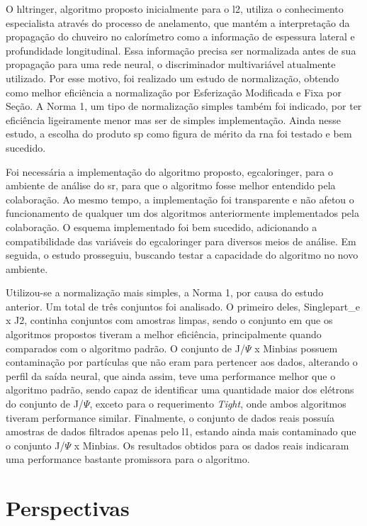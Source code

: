 O \gls{hltringer}, algoritmo proposto inicialmente para o \gls{l2}, utiliza o
conhecimento especialista através do processo de anelamento, que mantém a interpretação da propagação do
chuveiro no calorímetro como a informação de espessura lateral e profundidade
longitudinal. Essa informação precisa ser normalizada antes de sua propagação
para uma rede neural, o discriminador multivariável atualmente utilizado.
Por esse motivo, foi realizado um estudo de normalização, obtendo como 
melhor eficiência a normalização por Esferização Modificada e Fixa por Seção.
A Norma 1, um tipo de normalização simples também foi indicado, por ter
eficiência ligeiramente menor mas ser de simples implementação. Ainda nesse
estudo, a escolha do produto \gls{sp} como figura de mérito da \gls{rna} foi
testado e bem sucedido.

Foi necessária a implementação do algoritmo proposto, \gls{egcaloringer}, para o ambiente de análise
do \gls{sr}, para que o algoritmo fosse melhor
entendido pela colaboração. Ao mesmo tempo, a implementação foi transparente e não
afetou o funcionamento de qualquer um dos algoritmos anteriormente implementados
pela colaboração. O esquema implementado foi bem sucedido, adicionando a compatibilidade das variáveis
do \gls{egcaloringer} para diversos meios de análise. Em seguida, o estudo
prosseguiu, buscando testar a capacidade do algoritmo no novo ambiente.

Utilizou-se a normalização mais simples, a Norma 1, por causa do estudo anterior.
Um total de três conjuntos foi analisado. O primeiro deles, Singlepart\_e x J2,
continha conjuntos com amostras limpas, sendo o conjunto em que os algoritmos
propostos tiveram a melhor eficiência, principalmente quando comparados com o
algoritmo padrão. O conjunto de J/$\Psi$ x Minbias possuem contaminação por
partículas que não eram para pertencer aos dados, alterando o perfil da saída
neural, que ainda assim, teve uma performance melhor que o algoritmo padrão, sendo
capaz de identificar uma quantidade maior dos elétrons do conjunto de J/$\Psi$,
exceto para o requerimento \emph{Tight}, onde ambos algoritmos tiveram
performance similar. Finalmente, o conjunto de dados reais possuía amostras de
dados filtrados apenas pelo \gls{l1}, estando ainda mais contaminado que o
conjunto J/$\Psi$ x Minbias. Os resultados obtidos para os dados reais indicaram
uma performance bastante promissora para o algoritmo. 

  
\section{Perspectivas}


